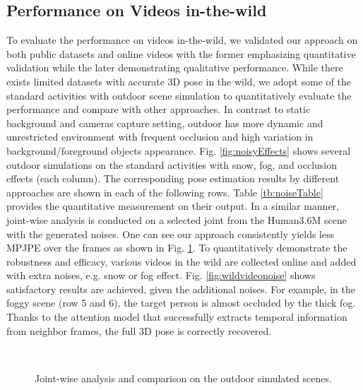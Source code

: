 \documentclass[twocolumn]{svjour3}          \smartqed  \usepackage{graphicx}
\begin{document}
\subsection{Performance on Videos in-the-wild}
To evaluate the performance on videos in-the-wild, we validated our approach on both public datasets and online videos with the former emphasizing quantitative validation while the later demonstrating qualitative performance. While there exists limited datasets with accurate 3D pose in the wild, we adopt some of the standard activities with outdoor scene simulation to quantitatively evaluate the performance and compare with other approaches. In contrast to static background and cameras capture setting, outdoor has more dynamic and unrestricted environment with frequent occlusion and high variation in background/foreground objects appearance. Fig. \ref{fig:noisyEffects} shows several outdoor simulations on the standard activities with snow, fog, and occlusion effects (each column). The corresponding pose estimation results by different approaches are shown in each of the following rows. Table \ref{tb:noiseTable} provides the quantitative measurement on their output. In a similar manner, joint-wise analysis is conducted on a selected joint from the Human3.6M scene with the generated noises. One can see our approach consistently yields less MPJPE over the frames as shown in Fig. \ref{fig:noise_joint-wise-across-frames}. To quantitatively demonstrate the robustness and efficacy, various videos in the wild are collected online and added with extra noises, e.g. snow or fog effect. Fig. \ref{fig:wildvideonoise} shows satisfactory results are achieved, given the additional noises. For example,  in the foggy scene (row 5 and 6), the target person is almost occluded by the thick fog. Thanks to the attention model that successfully extracts temporal information from neighbor frames, the full 3D pose is correctly recovered. 
\begin{figure}
    \centering
    \\
    \caption{Joint-wise analysis and comparison on the outdoor simulated scenes. }\label{fig:noise_joint-wise-across-frames}
\end{figure}
\end{document}
